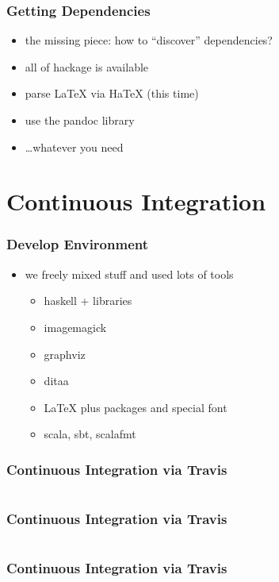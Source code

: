 \documentclass{beamer}
\begin{document}
\begin{frame}
  \frametitle{Getting Dependencies}
  \begin{itemize}
  \item the missing piece: how to ``discover'' dependencies?
  \item all of hackage is available
  \item parse LaTeX via HaTeX (this time)
  \item use the pandoc library
  \item \ldots whatever you need
  \end{itemize}
\end{frame}

\section{Continuous Integration}

\begin{frame}
  \frametitle{Develop Environment}
  \begin{itemize}
  \item we freely mixed stuff and used lots of tools
    \begin{itemize}
    \item haskell + libraries
    \item imagemagick
    \item graphviz
    \item ditaa
    \item LaTeX plus packages and special font
    \item scala, sbt, scalafmt
    \end{itemize}
  \end{itemize}
\end{frame}

\begin{frame}
  \frametitle{Continuous Integration via Travis}
  \inputminted[linenos=false, fontsize=\tiny, lastline=31]{yaml}{static-source/long-travis-ci.yml}
\end{frame}

\begin{frame}
  \frametitle{Continuous Integration via Travis}
  \inputminted[linenos=false, fontsize=\tiny, firstline=31, lastline=60]{yaml}{static-source/long-travis-ci.yml}
\end{frame}

\begin{frame}
  \frametitle{Continuous Integration via Travis}
  \inputminted[linenos=false, fontsize=\tiny, firstline=61, lastline=90]{yaml}{static-source/long-travis-ci.yml}
\end{frame}
\end{document}
